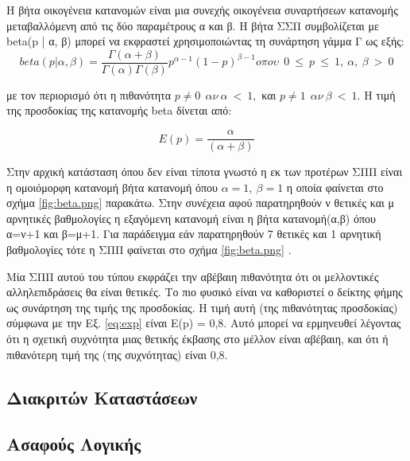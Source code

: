 Η βήτα οικογένεια κατανομών είναι μια συνεχής οικογένεια συναρτήσεων κατανομής μεταβαλλόμενη από τις δύο παραμέτρους α και β. Η βήτα ΣΣΠ συμβολίζεται με beta(p | α, β) μπορεί να εκφραστεί χρησιμοποιώντας τη συνάρτηση γάμμα Γ ως εξής:
\begin{equation}
beta(p|\alpha,\beta)= \frac{\Gamma\left(\alpha + \beta\right)}{\Gamma\left(\alpha\right)\Gamma\left(\beta\right)}p^{\alpha−1}\left(1-p\right)^{\beta-1} o \pi o \upsilon\ \  0\  ≤\  p\  ≤\  1,\  \alpha,\  \beta\  >\  0
\label{eq:beta}
\end{equation}

με τον περιορισμό ότι η πιθανότητα $ p \neq 0 \ \  \alpha \nu \  \alpha \  <\ 1,$ και $ p \neq 1 \ \  \alpha \nu \  \beta \  <\ 1$.
Η τιμή της προσδοκίας της κατανομής beta δίνεται από:

\begin{equation}
E\left(p\right) = \frac{\alpha}{\left(\alpha+\beta\right)}
\label{eq:exp}
\end{equation}

Στην αρχική κατάσταση όπου δεν είναι τίποτα γνωστό η εκ των προτέρων ΣΠΠ είναι η ομοιόμορφη κατανομή βήτα κατανομή όπου $\alpha=1,\ \beta = 1$ η οποία φαίνεται στο σχήμα \ref{fig:beta.png}  παρακάτω. Στην συνέχεια αφού παρατηρηθούν ν θετικές και μ αρνητικές βαθμολογίες η εξαγόμενη κατανομή είναι η βήτα κατανομή(α,β) όπου α=ν+1 και β=μ+1. Για παράδειγμα εάν παρατηρηθούν 7 θετικές και 1 αρνητική βαθμολογίες τότε η ΣΠΠ φαίνεται στο σχήμα \ref{fig:beta.png} .


\newpage
Μία ΣΠΠ αυτού του τύπου εκφράζει την αβέβαιη πιθανότητα ότι οι μελλοντικές αλληλεπιδράσεις θα είναι θετικές. Το πιο φυσικό είναι να καθοριστεί ο δείκτης φήμης ως συνάρτηση της τιμής της προσδοκίας. Η τιμή αυτή (της πιθανότητας προσδοκίας) σύμφωνα με την Εξ. \ref{eq:exp} είναι Ε(p) = 0,8. Αυτό μπορεί να ερμηνευθεί λέγοντας ότι η σχετική συχνότητα μιας θετικής έκβασης στο μέλλον είναι αβέβαιη, και ότι ή πιθανότερη τιμή της (της συχνότητας) είναι 0,8.

\subsection{ Διακριτών Καταστάσεων}



\subsection{Ασαφούς Λογικής}

